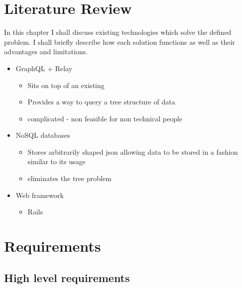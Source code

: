\documentclass[
  12pt,
]{article}
\providecommand{\tightlist}{%
  \setlength{\itemsep}{0pt}\setlength{\parskip}{0pt}}
\begin{document}
\hypertarget{literature-review}{%
\section{Literature Review}\label{literature-review}}

In this chapter I shall discuss existing technologies which solve the
defined problem. I shall briefly describe how each solution functions as
well as their advantages and limitations.

\begin{itemize}
\item
  GraphQL + Relay

  \begin{itemize}
  \tightlist
  \item
    Sits on top of an existing
  \item
    Provides a way to query a tree structure of data
  \item
    complicated - non feasible for non technical people
  \end{itemize}
\item
  NoSQL databases

  \begin{itemize}
  \tightlist
  \item
    Stores arbitrarily shaped json allowing data to be stored in a
    fashion similar to its usage
  \item
    eliminates the tree problem
  \end{itemize}
\item
  Web framework

  \begin{itemize}
  \tightlist
  \item
    Rails
  \end{itemize}
\end{itemize}

\hypertarget{requirements}{%
\section{Requirements}\label{requirements}}

\hypertarget{high-level-requirements}{%
\subsection{High level requirements}\label{high-level-requirements}}
\end{document}
